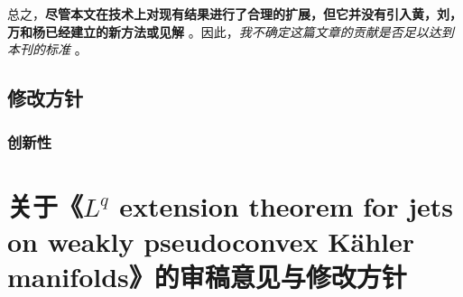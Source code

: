 \documentclass[lang=cn,zihao=-4,twoside,fontset=none]{textbook}
\begin{document}
总之，\textbf{尽管本文在技术上对现有结果进行了合理的扩展，但它并没有引入黄，刘，万和杨已经建立的新方法或见解} 。因此，\textit{我不确定这篇文章的贡献是否足以达到本刊的标准} 。
\clearpage
\newpage
\section{修改方针}
\subsection{创新性}


\chapter[关于第二篇论文的审稿意见与见解探讨]{关于《\texorpdfstring{$L^q$}{L^q} extension theorem for jets on weakly pseudoconvex K\"ahler manifolds》的审稿意见与修改方针}

\end{document}
